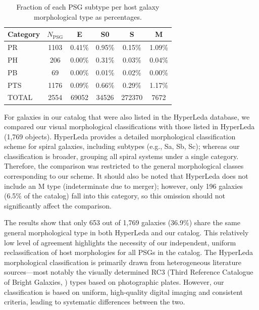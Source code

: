 \documentclass{aa}
\begin{document}
\begin{table}
\centering
\caption{Fraction of each PSG subtype per host galaxy morphological type as percentages.}
\begin{tabular}{l|c|cccc}
\hline
Category & $N_{\mathrm{PSG}}$ & E & S0 & S & M \\
\hline
\hline
PR & 1103 & 0.41\% & 0.95\% & 0.15\% & 1.09\% \\
PH & 206 & 0.00\% & 0.31\% & 0.03\% & 0.04\% \\
PB & 69 & 0.00\% & 0.01\% & 0.02\% & 0.00\% \\
PTS & 1176 & 0.09\% & 0.66\% & 0.29\% & 1.17\% \\
\hline
TOTAL & 2554 & 69052 & 34526 & 272370 & 7672 \\
\hline
\end{tabular}
\label{tab:psg_fractions_threeparts}
\end{table}


For galaxies in our catalog that were also listed in the HyperLeda database, we compared our visual morphological classifications with those listed in HyperLeda  (1,769 objects). HyperLeda provides a detailed morphological classification scheme for spiral galaxies, including subtypes (e.g., Sa, Sb, Sc); whereas our classification is broader, grouping all spiral systems under a single category. Therefore, the comparison was restricted to the general morphological classes corresponding to our scheme. It should also be noted that HyperLeda does not include an M type (indeterminate due to merger); however, only 196 galaxies (6.5\% of the catalog) fall into this category, so this omission should not significantly affect the comparison. 

The results show that only 653 out of 1,769 galaxies (36.9\%) share the same general morphological type in both HyperLeda and our catalog. This relatively low level of agreement highlights the necessity of our independent, uniform reclassification of host morphologies for all PSGs in the catalog. The HyperLeda morphological classification is primarily drawn from heterogeneous literature sources---most notably the visually determined RC3 (Third Reference Catalogue of Bright Galaxies, \citealt{1991rc3..book.....D}) types based on photographic plates. However, our classification is based on uniform, high-quality digital imaging and consistent criteria, leading to systematic differences between the two.
\end{document}
